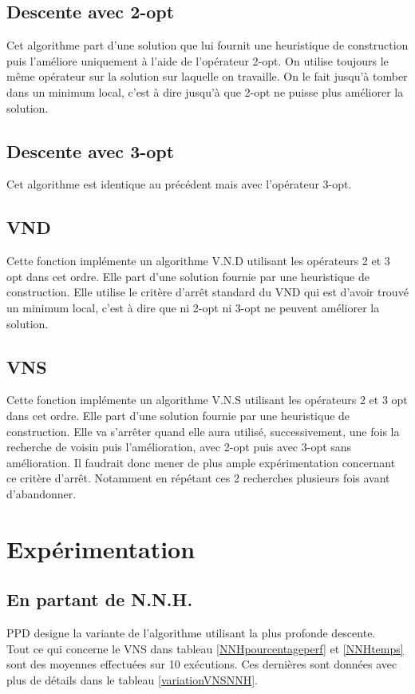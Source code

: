 \documentclass[12pt,a4paper]{article}
\begin{document}
\subsection{Descente avec 2-opt}

Cet algorithme part d'une solution que lui fournit une heuristique de construction puis l’améliore uniquement à l'aide de l'opérateur 2-opt. On utilise toujours le même opérateur sur la solution sur laquelle on travaille. On le fait jusqu’à tomber dans un minimum local, c'est à dire jusqu’à que 2-opt ne puisse plus améliorer la solution.

\subsection{Descente avec 3-opt}

Cet algorithme est identique au précédent mais avec l'opérateur 3-opt.

\subsection{VND}

Cette fonction implémente un algorithme V.N.D utilisant les opérateurs 2 et 3 opt dans cet ordre. Elle part d'une solution fournie par une heuristique de construction. Elle utilise le critère d’arrêt standard du VND qui est d'avoir trouvé un minimum local, c'est à dire que ni 2-opt ni 3-opt ne peuvent améliorer la solution.

\subsection{VNS}

Cette fonction implémente un algorithme V.N.S utilisant les opérateurs 2 et 3 opt dans cet ordre. Elle part d'une solution fournie par une heuristique de construction. Elle va s’arrêter quand elle aura utilisé, successivement, une fois la recherche de voisin puis l'amélioration, avec 2-opt puis avec 3-opt sans amélioration. Il faudrait donc mener de plus ample expérimentation concernant ce critère d’arrêt. Notamment en répétant ces 2 recherches plusieurs fois avant d'abandonner.

\section{Expérimentation}
\subsection{En partant de N.N.H.}
PPD designe la variante de l'algorithme utilisant la plus profonde descente.\\
Tout ce qui concerne le VNS dans tableau \ref{NNHpourcentageperf} et \ref{NNHtemps} sont des moyennes effectuées sur 10 exécutions. Ces dernières sont données avec plus de détails dans le tableau \ref{variationVNSNNH}.\\
\end{document}
